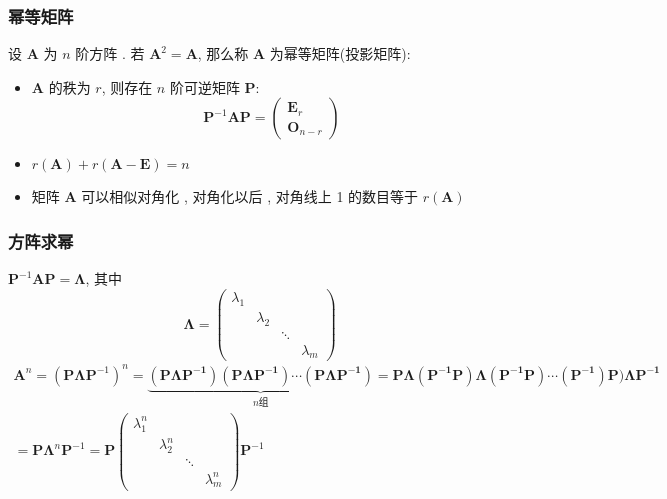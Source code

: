 \documentclass{article}
\begin{document}
			\subsubsection{幂等矩阵}
				设 $\boldsymbol A$ 为 $n$ 阶方阵 . 若 $\boldsymbol A^{2}=\boldsymbol A$, 那么称 $\boldsymbol A$ 为幂等矩阵(投影矩阵):
				\begin{itemize}
					\item $\boldsymbol{A}$ 的秩为 $r$, 则存在 $n$ 阶可逆矩阵 $\boldsymbol{P}$:
					$$
					\boldsymbol{P}^{-1} \boldsymbol{A P}=\left(\begin{array}{l}
						\boldsymbol{E}_{r} \\
						\boldsymbol{O}_{n-r}
					\end{array}\right)
					$$
					\item $r(\boldsymbol A)+r(\boldsymbol A-\boldsymbol E)=n$
					\item 矩阵 $\boldsymbol A$ 可以相似对角化 , 对角化以后 , 对角线上 1 的数目等于 $r(\boldsymbol A)$
				\end{itemize}
			\subsubsection{方阵求幂}
				$\boldsymbol{P}^{-1} \boldsymbol{A P}=\boldsymbol{\Lambda}$, 其中
				$$
				\boldsymbol{\Lambda}=
				\left(\begin{array}{ccccc}
					\lambda_{1} & & & \\
					& \lambda_{2} & & \\
					& & \ddots & \\
					& & & \lambda_{m}
				\end{array}\right)
				$$
				$$
				\begin{gathered}
					\boldsymbol{A}^{n}=\left(\boldsymbol{P} \boldsymbol{\Lambda} \boldsymbol{P}^{-1}\right)^{n}=
					\underbrace{(\boldsymbol{P}\boldsymbol{\Lambda}\boldsymbol{P^{-1}}) (\boldsymbol{P}\boldsymbol{\Lambda}\boldsymbol{P^{-1}}) \cdots 	(\boldsymbol{P}\boldsymbol{\Lambda}\boldsymbol{P^{-1}}) }_{n\text{组}}
					=\boldsymbol{P}\boldsymbol{\Lambda}(\boldsymbol{P^{-1}} \boldsymbol{P})\boldsymbol{\Lambda}(\boldsymbol{P^{-1}}\boldsymbol{P}) \cdots 	(\boldsymbol{P^{-1}})\boldsymbol{P})\boldsymbol{\Lambda}\boldsymbol{P^{-1}}\\
					=\boldsymbol{P} \boldsymbol{\Lambda}^{n} \boldsymbol{P}^{-1}=\boldsymbol{P} \left(\begin{array}{ccccc}
						\lambda_{1}^{n} & & & \\
						& \lambda_{2}^{n} & & \\
						& & \ddots & \\
						& & & \lambda_{m}^{n}
					\end{array}\right) \boldsymbol{P}^{-1}
				\end{gathered}
				$$
\end{document}
